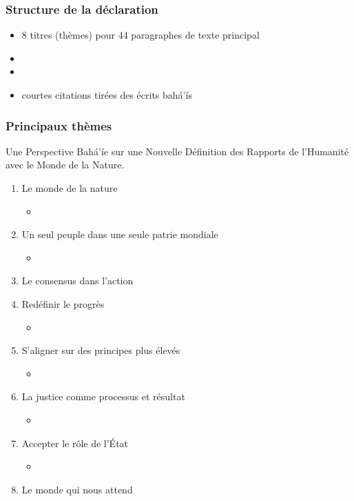 \documentclass[11pt,xcolor={dvipsnames},hyperref={pdftex,pdfpagemode=UseNone,hidelinks,pdfdisplaydoctitle=true},usepdftitle=false]{beamer}
\begin{document}
\begin{frame}
  \frametitle{Structure de la déclaration}
  \begin{itemize}
    \item 8 titres (thèmes) pour 44 paragraphes de texte principal
    \item {}
    \item {}
    \item courtes citations tirées des écrits bahá'ís
  \end{itemize}
\end{frame}

\begin{frame}[allowframebreaks=0.8]
  \frametitle{Principaux thèmes}
  Une Perspective Bahá’íe sur une Nouvelle Définition des Rapports de l’Humanité
  avec le Monde de la Nature.
  \begin{enumerate}
    \item Le monde de la nature 
      \begin{itemize}
        \item {}
      \end{itemize}
    \item Un seul peuple dans une seule patrie mondiale \alr{+}
      \begin{itemize}
        \item {}
      \end{itemize}
    \item Le consensus dans l'action \alr{+}
    \item Redéfinir le progrès \alr{+}
      \begin{itemize}
        \item {}
      \end{itemize}
    \item S’aligner sur des principes plus élevés \alr{+}
      \begin{itemize}
        \item {}
      \end{itemize}
    \item La justice comme processus et résultat \alr{+}
      \begin{itemize}
        \item {}
      \end{itemize}
    \item Accepter le rôle de l’État \alr{+}
      \begin{itemize}
        \item {}
      \end{itemize}
    \item Le monde qui nous attend
  \end{enumerate}
\end{frame}
\end{document}
